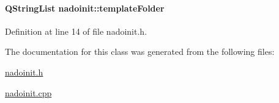 \hypertarget{classnadoinit_a0ea5be240109fb2373f7544bb68a1e4a}{
\paragraph[{template\-Folder}]{\setlength{\rightskip}{0pt plus 5cm}\-Q\-String\-List {\bf nadoinit\-::template\-Folder}}}\label{classnadoinit_a0ea5be240109fb2373f7544bb68a1e4a}


\-Definition at line 14 of file nadoinit.\-h.



\-The documentation for this class was generated from the following files\-:\begin{DoxyCompactItemize}
\item 
\hyperlink{nadoinit_8h}{nadoinit.\-h}\item 
\hyperlink{nadoinit_8cpp}{nadoinit.\-cpp}\end{DoxyCompactItemize}
